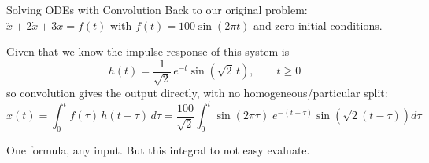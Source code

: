 \documentclass[12pt, aspectratio=169]{beamer}
\begin{document}

\begin{frame}{Solving ODEs with Convolution}
    Back to our original problem: $\ddot{x} + 2\dot{x} + 3x = f(t)$ with
    $f(t) = 100\sin(2\pi t)$ and zero initial conditions.
    \vspace{0.3em}

    Given that we know the impulse response of this system is
    \[
        h(t) = \frac{1}{\sqrt{2}}\,e^{-t}\sin\!\left(\sqrt{2}\,t\right), \qquad t \ge 0
    \]
    so convolution gives the output directly, with no homogeneous/particular split:
    \[
        x(t) = \int_{0}^{t} f(\tau)\,h(t-\tau)\,d\tau
             = \frac{100}{\sqrt{2}}\int_{0}^{t}
               \sin(2\pi\tau)\;e^{-(t-\tau)}\sin\!\left(\sqrt{2}(t-\tau)\right) d\tau
    \]
    \begin{center}
        \alert{One formula, any input. But this integral to not easy evaluate.}
    \end{center}
\end{frame}
\end{document}
